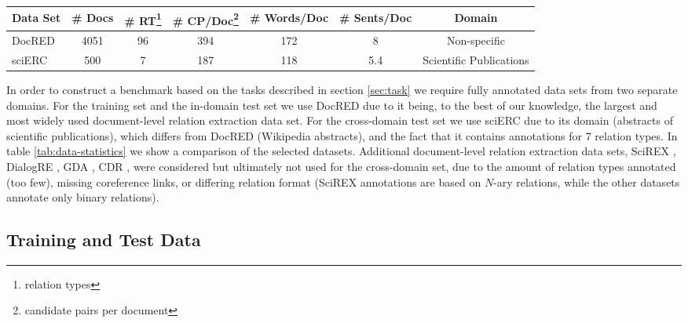 \documentclass[11pt]{article}
\begin{document}
\begin{table*}
\centering
\renewcommand\thempfootnote{\arabic{mpfootnote}}
\begin{minipage}{\textwidth} 

\begin{tabular}{lcccccc}
\hline
\textbf{Data Set} & \textbf{\# Docs} & \textbf{\# RT\footnote{relation types}} & \textbf{\# CP/Doc\footnote{candidate pairs per document}} & \textbf{\# Words/Doc} & \textbf{\# Sents/Doc} & \textbf{Domain}\\
\hline
DocRED & 4051 & 96 & 394 & 172 & 8 & Non-specific\\
sciERC & 500 & 7 & 187 & 118 & 5.4 & Scientific Publications\\
\hline
\end{tabular}
\end{minipage}
\caption{\label{tab:data-statistics} A comparison of DocRED \cite{yao_docred_2019} and sciERC \cite{luan_multi-task_2018}, the datasets selected for the FREDo benchmark.}
\end{table*}



In order to construct a benchmark based on the tasks described in section \ref{sec:task} we require fully annotated data sets from two separate domains.
For the training set and the in-domain test set we use Doc\-RED \cite{yao_docred_2019} due to it being, to the best of our knowledge, the largest and most widely used document-level relation extraction data set. 
For the cross-domain test set we use sciERC \cite{luan_multi-task_2018} due to its domain (abstracts of scientific publications), which differs from DocRED (Wikipedia abstracts), and the fact that it contains annotations for 7 relation types. In table \ref{tab:data-statistics} we show a comparison of the selected datasets.
Additional document-level relation extraction data sets, SciREX \cite{jain-etal-2020-scirex}, DialogRE \cite{yu2020dialogue}, GDA \cite{wu_renet_2019}, CDR \cite{li_biocreative_2016}, were considered but ultimately not used for the cross-domain set, due to the amount of relation types annotated (too few), missing coreference links, or differing relation format (SciREX annotations are based on $N$-ary relations, while the other datasets annotate only binary relations).

\subsection{Training and Test Data}
\end{document}
